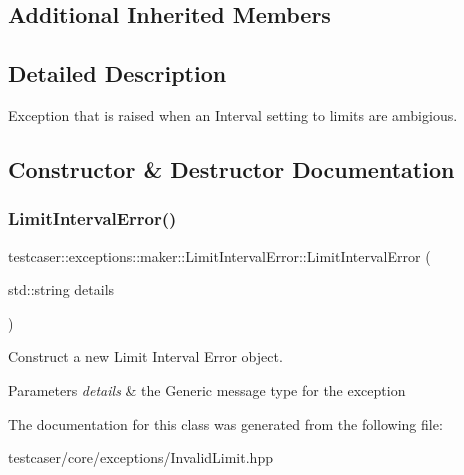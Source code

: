 \subsection*{Additional Inherited Members}


\subsection{Detailed Description}
Exception that is raised when an Interval setting to limits are ambigious. 

\subsection{Constructor \& Destructor Documentation}
\mbox{\label{classtestcaser_1_1exceptions_1_1maker_1_1LimitIntervalError_aa25b5fb862cea4c6946ee334cb7590eb}} 
\subsubsection{\texorpdfstring{Limit\+Interval\+Error()}{LimitIntervalError()}}
{\footnotesize\ttfamily testcaser\+::exceptions\+::maker\+::\+Limit\+Interval\+Error\+::\+Limit\+Interval\+Error (\begin{DoxyParamCaption}\item[{std\+::string}]{details }\end{DoxyParamCaption})\hspace{0.3cm}{\ttfamily [inline]}}



Construct a new Limit Interval Error object. 


\begin{DoxyParams}{Parameters}
{\em details} & the Generic message type for the exception \\
\hline
\end{DoxyParams}


The documentation for this class was generated from the following file\+:\begin{DoxyCompactItemize}
\item 
testcaser/core/exceptions/Invalid\+Limit.\+hpp\end{DoxyCompactItemize}
